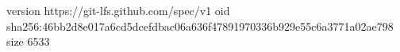 version https://git-lfs.github.com/spec/v1
oid sha256:46bb2d8e017a6cd5dcefdbac06a636f47891970336b929e55c6a3771a02ae798
size 6533
